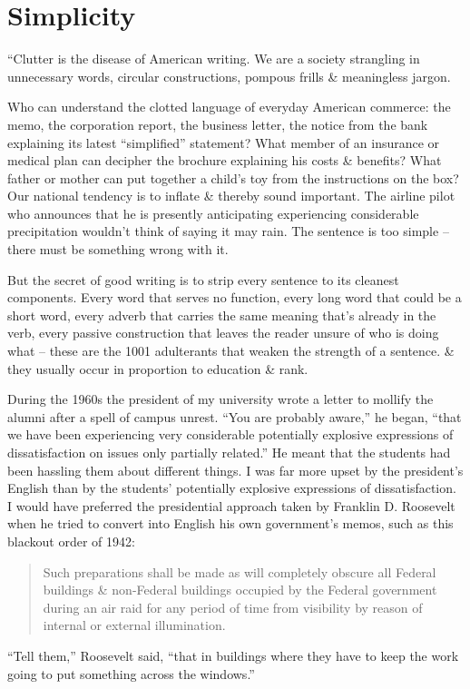 \documentclass{article}
\begin{document}

\section{Simplicity}
``Clutter is the disease of American writing. We are a society strangling in unnecessary words, circular constructions, pompous frills \& meaningless jargon.

Who can understand the clotted language of everyday American commerce: the memo, the corporation report, the business letter, the notice from the bank explaining its latest ``simplified'' statement? What member of an insurance or medical plan can decipher the brochure explaining his costs \& benefits? What father or mother can put together a child's toy from the instructions on the box? Our national tendency is to inflate \& thereby sound important. The airline pilot who announces that he is presently anticipating experiencing considerable precipitation wouldn't think of saying it may rain. The sentence is too simple -- there must be something wrong with it.

But the secret of good writing is to strip every sentence to its cleanest components. Every word that serves no function, every long word that could be a short word, every adverb that carries the same meaning that's already in the verb, every passive construction that leaves the reader unsure of who is doing what -- these are the 1001 adulterants that weaken the strength of a sentence. \& they usually occur in proportion to education \& rank.

During the 1960s the president of my university wrote a letter to mollify the alumni after a spell of campus unrest. ``You are probably aware,'' he began, ``that we have been experiencing very considerable potentially explosive expressions of dissatisfaction on issues only partially related.'' He meant that the students had been hassling them about different things. I was far more upset by the president's English than by the students' potentially explosive expressions of dissatisfaction. I would have preferred the presidential approach taken by Franklin D. Roosevelt when he tried to convert into English his own government's memos, such as this blackout order of 1942:
\begin{quotation}
	Such preparations shall be made as will completely obscure all Federal buildings \& non-Federal buildings occupied by the Federal government during an air raid for any period of time from visibility by reason of internal or external illumination.
\end{quotation}
``Tell them,'' Roosevelt said, ``that in buildings where they have to keep the work going to put something across the windows.''
\end{document}
